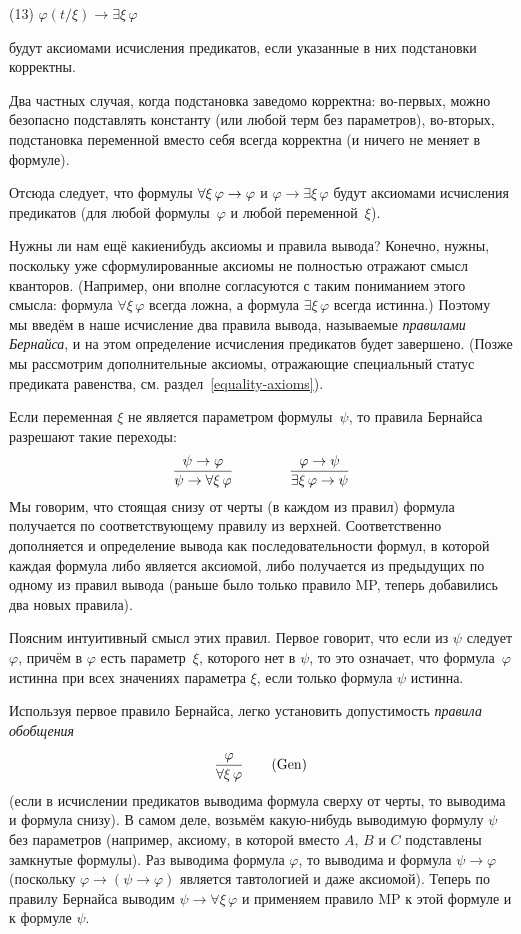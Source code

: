(13) $\varphi(t/\xi)\to \exists \xi\,\varphi$

\noindent
будут аксиомами исчисления предикатов, если указанные в них
подстановки корректны.

Два частных случая, когда подстановка заведомо корректна:
во-первых, можно безопасно подставлять константу (или любой терм
без параметров), во-вторых, подстановка переменной вместо себя
всегда корректна (и ничего не меняет в формуле).

Отсюда следует, что формулы $\forall \xi\,\varphi\hm\to\varphi$
и $\varphi\to\exists\xi\,\varphi$ будут аксиомами исчисления
предикатов (для любой формулы~$\varphi$ и любой переменной~$\xi$).

Нужны ли нам ещё какие\д нибудь аксиомы и правила вывода?
Конечно, нужны, поскольку уже сформулированные аксиомы не
полностью отражают смысл кванторов. (Например, они вполне
согласуются с таким пониманием этого смысла: формула $\forall
\xi\,\varphi$ всегда ложна, а формула $\exists\xi\,\varphi$
всегда истинна.) Поэтому мы введём в наше исчисление два правила
вывода, называемые \emph{правилами Бернайса},%
%
%
и на этом
определение исчисления предикатов будет завершено. (Позже мы
рассмотрим дополнительные аксиомы, отражающие специальный статус
предиката равенства, см. раздел~\ref{equality-axioms}).

Если переменная $\xi$ не является параметром формулы~$\psi$, то
правила Бернайса разрешают такие переходы:
         $$
\frac{\mathstrut \psi \to \varphi}
{\mathstrut\psi\to\forall\xi\,\varphi}
\qquad
\qquad
\frac{\mathstrut \varphi\to\psi}
{\mathstrut\exists\xi\,\varphi\to\psi}
        $$
Мы говорим, что стоящая снизу от черты (в каждом из правил)
формула получается по соответствующему правилу из верхней.
Соответственно дополняется и определение вывода как
последовательности формул, в которой каждая формула либо
является аксиомой, либо получается из предыдущих по одному из
правил вывода (раньше было только правило MP, теперь добавились
два новых правила).

Поясним интуитивный смысл этих правил. Первое говорит, что если
из $\psi$ следует $\varphi$, причём в $\varphi$ есть
параметр~$\xi$, которого нет в $\psi$, то это означает, что
формула~$\varphi$ истинна при всех значениях параметра $\xi$, если
только формула $\psi$ истинна.

Используя первое правило Бернайса, легко установить допустимость
\emph{правила обобщения}%
%
%
\label{generalization}
        $$
\frac{\mathstrut\varphi}{\mathstrut\forall\xi\,\varphi}\qquad\text{(Gen)}
        $$
(если в исчислении предикатов выводима формула сверху от
черты, то выводима и формула снизу). В самом деле, возьмём
какую-нибудь выводимую формулу $\psi$ без параметров (например,
аксиому, в которой вместо $A$, $B$ и $C$ подставлены замкнутые
формулы). Раз выводима формула $\varphi$, то выводима
и формула $\psi\to\varphi$ (поскольку $\varphi\to(\psi\to\varphi)$
является тавтологией и даже аксиомой). Теперь по правилу Бернайса
выводим $\psi\to\forall\xi\,\varphi$ и применяем правило
MP к этой формуле и к формуле $\psi$.

